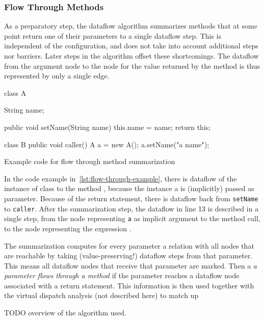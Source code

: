 \subsubsection*{Flow Through Methods}
As a preparatory step, the dataflow algorithm summarizes methods that at some point 
return one of their parameters to a single dataflow step.
This is independent of the configuration, and does not take into account
additional steps nor barriers.
Later steps in the algorithm offset these shortcomings.
The dataflow from the argument node to the node for the value returned by
the method is thus represented by only a single edge.
\begin{listing}[H]
    \begin{javacode}
        class A {
            String name;
        
            public void setName(String name) {
                this.name = name;
                return this;
            }
        }
    
        class B {
            public void caller() {
                A a = new A();
                a.setName("a name");
            }
        }
    \end{javacode}
    \caption{Example code for flow through method summarization}    
    \label{lst:flow-through-example}
\end{listing}
In the code example in~\autoref{lst:flow-through-example}, there is dataflow of the instance
of class  to the method , because the instance a 
is (implicitly) passed as  parameter.
Because of the return statement, there is dataflow back from \texttt{setName} to
\texttt{caller}.
After the summarization step, the dataflow in line 13 is described in a single step,
from the node representing \texttt{a} as implicit argument to the method call, to the node 
representing the expression .

The summarization computes for every parameter a relation with all nodes 
that are reachable by taking (value-preserving!) dataflow steps from that parameter.
This means all dataflow nodes that receive that parameter are marked.
Then a \emph{a parameter flows through a method} if the parameter reaches a 
dataflow node associated with a return statement.
This information is then used together with the virtual dispatch analysis
(not described here) to match up 

TODO overview of the algorithm used.

